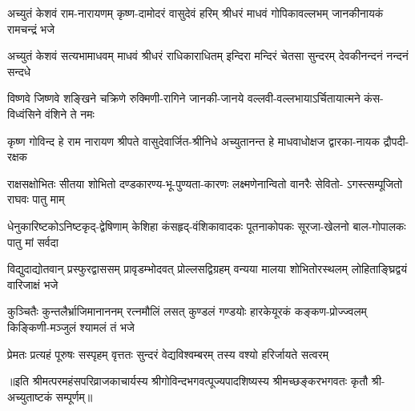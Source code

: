 

\fourlineindentedshloka
{अच्युतं केशवं राम-नारायणम्}
{कृष्ण-दामोदरं वासुदेवं हरिम्}
{श्रीधरं माधवं गोपिकावल्लभम्}
{जानकीनायकं रामचन्द्रं भजे}

\fourlineindentedshloka
{अच्युतं केशवं सत्यभामाधवम्}
{माधवं श्रीधरं राधिकाराधितम्}
{इन्दिरा मन्दिरं चेतसा सुन्दरम्}
{देवकीनन्दनं नन्दनं सन्दधे}

\fourlineindentedshloka
{विष्णवे जिष्णवे शङ्खिने चक्रिणे}
{रुक्मिणी-रागिने जानकी-जानये}
{वल्लवी-वल्लभायाऽर्चितायात्मने}
{कंस-विध्वंसिने वंशिने ते नमः}

\fourlineindentedshloka
{कृष्ण गोविन्द हे राम नारायण}
{श्रीपते वासुदेवार्जित-श्रीनिधे}
{अच्युतानन्त हे माधवाधोक्षज}
{द्वारका-नायक द्रौपदी-रक्षक}

\fourlineindentedshloka
{राक्षसक्षोभितः सीतया शोभितो}
{दण्डकारण्य-भू-पुण्यता-कारणः}
{लक्ष्मणेनान्वितो वानरैः सेवितो-}
{ऽगस्त्सम्पूजितो राघवः पातु माम्}

\fourlineindentedshloka
{धेनुकारिष्टकोऽनिष्टकृद्-द्वेषिणाम्}
{केशिहा कंसहृद्-वंशिकावादकः}
{पूतनाकोपकः सूरजा-खेलनो}
{बाल-गोपालकः पातु मां सर्वदा}

\fourlineindentedshloka
{विद्युदाद्योतवान् प्रस्फुरद्वाससम्}
{प्रावृडम्भोदवत् प्रोल्लसद्विग्रहम्}
{वन्यया मालया शोभितोरस्थलम्}
{लोहिताङ्घ्रिद्वयं वारिजाक्षं भजे}

\fourlineindentedshloka
{कुञ्चितैः कुन्तलैर्भ्राजिमानाननम्}
{रत्नमौलिं लसत् कुण्डलं गण्डयोः}
{हारकेयूरकं कङ्कण-प्रोज्ज्वलम्}
{किङ्किणी-मञ्जुलं श्यामलं तं भजे}

{प्रेमतः प्रत्यहं पूरुषः सस्पृहम्}
{वृत्ततः सुन्दरं वेद्यविश्वम्बरम्}
{तस्य वश्यो हरिर्जायते सत्वरम्}

॥इति श्रीमत्परमहंसपरिव्राजकाचार्यस्य श्रीगोविन्दभगवत्पूज्यपादशिष्यस्य 
श्रीमच्छङ्करभगवतः कृतौ श्री-अच्युताष्टकं सम्पूर्णम्॥